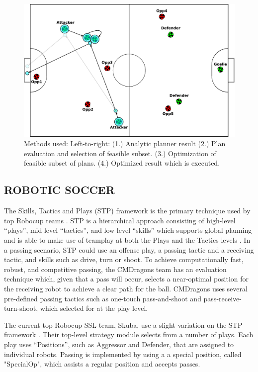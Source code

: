 \documentclass[a4paper, 10pt, conference]{ieeeconf}      %
\begin{document}
\begin{figure}[ht!]
\begin{center}
\includegraphics[totalheight=1.0in]{plan4_resized}
\end{center}
\caption{Methods used: Left-to-right: (1.) Analytic planner result (2.) Plan evaluation and selection of feasible subset. (3.) Optimization of feasible subset of plans. (4.) Optimized result which is executed.}
\end{figure}

\subsection{ROBOTIC SOCCER}

The Skills, Tactics and Plays (STP) framework is the primary technique used by top Robocup teams \cite{bruce2003multi}. STP is a hierarchical approach consisting of high-level ``plays'', mid-level ``tactics'', and low-level ``skills'' which supports global planning and is able to make use of teamplay at both the Plays and the Tactics levels \cite{browning2005stp}. In a passing scenario, STP could use an offense play, a passing tactic and a receiving tactic, and skills such as drive, turn or shoot. To achieve computationally fast, robust, and competitive passing, the CMDragons team has an evaluation technique which, given that a pass will occur, selects a near-optimal position for the receiving robot to achieve a clear path for the ball. CMDragons uses several pre-defined passing tactics such as one-touch pass-and-shoot and pass-receive-turn-shoot, which selected for at the play level.

The current top Robocup SSL team, Skuba, use a slight variation on the STP framework \cite{skubaETD}. Their top-level strategy module selects from a number of plays. Each play uses ``Positions'', such as Aggressor and Defender, that are assigned to individual robots. Passing is implemented by using a a special position, called "SpecialOp", which assists a regular position and accepts passes.
\end{document}
